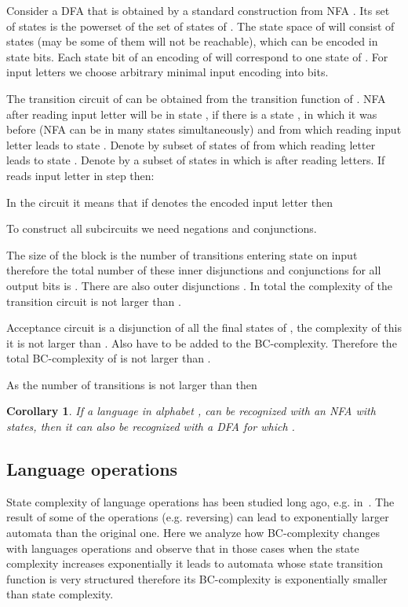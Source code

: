\documentclass[copyright, creativecommons]{eptcs}
\newcommand{\qed}{}
\newtheorem{corollary}[theorem]{Corollary}
\newenvironment{proof}[1][Proof]{\begin{trivlist}
\item[\hskip \labelsep {\bfseries #1}]}{\end{trivlist}}
\begin{document}
\begin{proof}
Consider a DFA  that is obtained by a standard construction from NFA . Its set of states is the
powerset of the set of states of . The state space of  will consist of  states
(may be some of them will not be reachable), which can be encoded in  state bits. Each state
bit of an encoding of  will correspond to one state of . For input letters we choose arbitrary
minimal input encoding into  bits.

The transition circuit of  can be obtained from the transition function of .
NFA  after reading input letter  will be in state ,
if there is a state , in which it was before (NFA can be in many states simultaneously)
and from which reading input letter  leads to state . Denote by  subset of states of  from which
reading letter  leads to state . Denote by  a subset of states in which  is after reading  letters.
If  reads input letter  in step  then:

In the circuit it means that if  denotes the encoded input letter then



To construct all  subcircuits  we need  negations and  conjunctions.

The size of the block  is the number of transitions entering state  on input  therefore the total number of these inner disjunctions and conjunctions for all output bits  is . There are also  outer disjunctions
.
In total the complexity of the transition circuit is not larger than .

Acceptance circuit  is a disjunction of all the final states
of , the complexity of this it is not larger than . Also  have to be added to the BC-complexity.
Therefore the total BC-complexity of  is not larger than .
\qed
\end{proof}

As the number of transitions is not larger than  then
\begin{corollary}
\label{nedet}
If a language  in alphabet ,  can be recognized with an NFA  with  states,
then it can also be recognized
with a DFA  for which
.
\end{corollary}



\subsection{Language operations}

State complexity of language operations has been studied long ago, e.g. in~\cite{SY00}. The result of some of the operations
(e.g. reversing) can lead to exponentially larger automata than the original one. Here we analyze how BC-complexity
changes with languages operations and observe that in those cases when the state complexity increases exponentially
it leads to automata whose state transition function is very structured therefore its BC-complexity is exponentially smaller
than state complexity.
\end{document}
